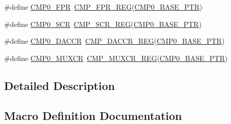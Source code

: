 \begin{DoxyCompactItemize}
\item 
\#define \hyperlink{group___c_m_p___register___accessor___macros_gafc67824f9a3bc92eaf359c91bf1df5b6}{C\+M\+P0\+\_\+\+F\+PR}~\hyperlink{group___c_m_p___register___accessor___macros_gac3a57bc4a8faf059f7271bca5af68846}{C\+M\+P\+\_\+\+F\+P\+R\+\_\+\+R\+EG}(\hyperlink{group___c_m_p___peripheral_ga5a7a6b1d0743a05435ba5cb2dc2b3431}{C\+M\+P0\+\_\+\+B\+A\+S\+E\+\_\+\+P\+TR})
\item 
\#define \hyperlink{group___c_m_p___register___accessor___macros_ga4b5f2afaed69d7a475c7b49e6072c2d1}{C\+M\+P0\+\_\+\+S\+CR}~\hyperlink{group___c_m_p___register___accessor___macros_ga678da61cf26cf0494da5f50012b39a88}{C\+M\+P\+\_\+\+S\+C\+R\+\_\+\+R\+EG}(\hyperlink{group___c_m_p___peripheral_ga5a7a6b1d0743a05435ba5cb2dc2b3431}{C\+M\+P0\+\_\+\+B\+A\+S\+E\+\_\+\+P\+TR})
\item 
\#define \hyperlink{group___c_m_p___register___accessor___macros_ga35e0e1f16fe611949cc7970ad0119891}{C\+M\+P0\+\_\+\+D\+A\+C\+CR}~\hyperlink{group___c_m_p___register___accessor___macros_ga5b7c17c68ee9198e701deff8f750ca2b}{C\+M\+P\+\_\+\+D\+A\+C\+C\+R\+\_\+\+R\+EG}(\hyperlink{group___c_m_p___peripheral_ga5a7a6b1d0743a05435ba5cb2dc2b3431}{C\+M\+P0\+\_\+\+B\+A\+S\+E\+\_\+\+P\+TR})
\item 
\#define \hyperlink{group___c_m_p___register___accessor___macros_ga5ee1e22a7f08ec3cdad0083a790b10b3}{C\+M\+P0\+\_\+\+M\+U\+X\+CR}~\hyperlink{group___c_m_p___register___accessor___macros_gaf82bcece4b697f01171a785589591a8c}{C\+M\+P\+\_\+\+M\+U\+X\+C\+R\+\_\+\+R\+EG}(\hyperlink{group___c_m_p___peripheral_ga5a7a6b1d0743a05435ba5cb2dc2b3431}{C\+M\+P0\+\_\+\+B\+A\+S\+E\+\_\+\+P\+TR})
\end{DoxyCompactItemize}


\subsection{Detailed Description}


\subsection{Macro Definition Documentation}
\mbox{\label{group___c_m_p___register___accessor___macros_ga0b4ea995265b027fb308b236b2f0afd4}} 
